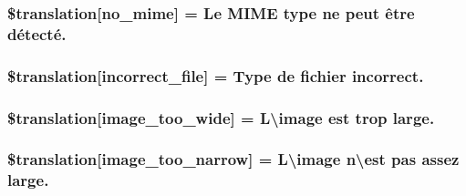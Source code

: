 \subsubsection[{\$translation}]{\setlength{\rightskip}{0pt plus 5cm}\$translation\mbox{[}\textquotesingle{}no\+\_\+mime\textquotesingle{}\mbox{]} = \textquotesingle{}Le M\+I\+M\+E type ne peut être détecté.\textquotesingle{}}\label{class_8upload_8fr___f_r_8php_a191a55df8e3bb7f3c51b70f3c1932e02}
\hypertarget{class_8upload_8fr___f_r_8php_a4d32343e2699edd6fd435f9c832cb9c7}{}
\subsubsection[{\$translation}]{\setlength{\rightskip}{0pt plus 5cm}\$translation\mbox{[}\textquotesingle{}incorrect\+\_\+file\textquotesingle{}\mbox{]} = \textquotesingle{}Type de fichier incorrect.\textquotesingle{}}\label{class_8upload_8fr___f_r_8php_a4d32343e2699edd6fd435f9c832cb9c7}
\hypertarget{class_8upload_8fr___f_r_8php_a0dd3e4930ca1f59ae280f4b1006525cd}{}
\subsubsection[{\$translation}]{\setlength{\rightskip}{0pt plus 5cm}\$translation\mbox{[}\textquotesingle{}image\+\_\+too\+\_\+wide\textquotesingle{}\mbox{]} = \textquotesingle{}L\textbackslash{}\textquotesingle{}image est trop large.\textquotesingle{}}\label{class_8upload_8fr___f_r_8php_a0dd3e4930ca1f59ae280f4b1006525cd}
\hypertarget{class_8upload_8fr___f_r_8php_a5c9a4cd67fd21c32e0a3b434591a6037}{}
\subsubsection[{\$translation}]{\setlength{\rightskip}{0pt plus 5cm}\$translation\mbox{[}\textquotesingle{}image\+\_\+too\+\_\+narrow\textquotesingle{}\mbox{]} = \textquotesingle{}L\textbackslash{}\textquotesingle{}image n\textbackslash{}est pas assez large.\textquotesingle{}}\label{class_8upload_8fr___f_r_8php_a5c9a4cd67fd21c32e0a3b434591a6037}
\hypertarget{class_8upload_8fr___f_r_8php_aa27bde361343f3b63c7cd441860024f8}{}
